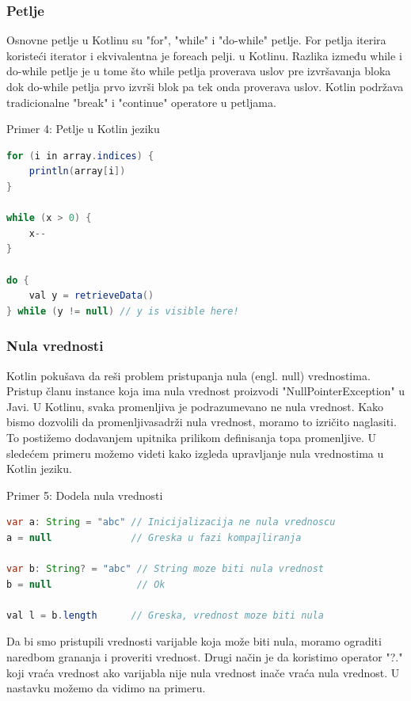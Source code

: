 \documentclass[12pt,oneside]{memoir}
\begin{document}
 
\subsubsection{Petlje}
Osnovne petlje u Kotlinu su "for", "while" i "do-while" petlje. For petlja iterira koristeći iterator i ekvivalentna je foreach pelji.
u Kotlinu. Razlika između while i do-while petlje je u tome što while petlja proverava uslov pre izvršavanja bloka dok do-while petlja prvo izvrši blok pa tek onda proverava uslov. Kotlin podržava tradicionalne "break" i "continue" operatore u petljama.

\begin{center} Primer 4: Petlje u Kotlin jeziku\end{center}
\begin{lstlisting}[language=Java]
for (i in array.indices) {
    println(array[i])
}
 
while (x > 0) {
    x--
}
 
do {
    val y = retrieveData()
} while (y != null) // y is visible here!
\end{lstlisting}
 
\subsubsection{Nula vrednosti}
Kotlin pokušava da reši problem pristupanja nula (engl. null) vrednostima. Pristup članu instance koja ima nula vrednost proizvodi "NullPointerException" u Javi. U Kotlinu, svaka promenljiva je podrazumevano ne nula vrednost. Kako bismo dozvolili da promenljivasadrži nula vrednost, moramo to izričito naglasiti. To postižemo dodavanjem upitnika prilikom definisanja topa promenljive. U sledećem primeru možemo videti kako izgleda upravljanje nula vrednostima u Kotlin jeziku.

\begin{center} Primer 5: Dodela nula vrednosti\end{center}
\begin{lstlisting}[language=Java]
var a: String = "abc" // Inicijalizacija ne nula vrednoscu
a = null              // Greska u fazi kompajliranja
 
var b: String? = "abc" // String moze biti nula vrednost
b = null               // Ok
 
val l = b.length      // Greska, vrednost moze biti nula
\end{lstlisting}
 
Da bi smo pristupili vrednosti varijable koja može biti nula, moramo ograditi naredbom grananja i proveriti vrednost. Drugi način je da koristimo operator "?." koji vraća vrednost ako varijabla nije nula vrednost inače vraća nula vrednost. U nastavku možemo da vidimo na primeru.
 
\end{document}
